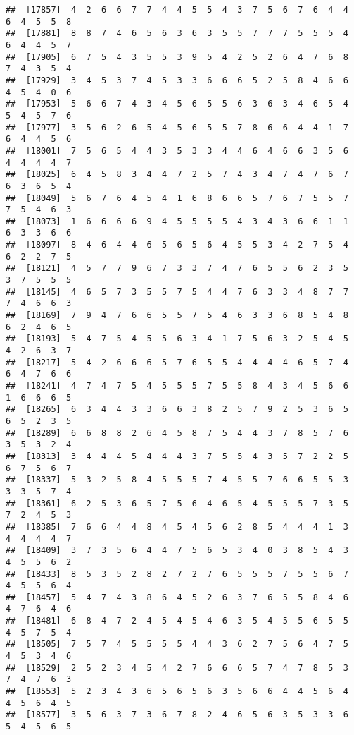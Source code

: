 \documentclass[
]{book}
\begin{document}
\begin{verbatim}
##  [17857]  4  2  6  6  7  7  4  4  5  5  4  3  7  5  6  7  6  4  4  6  4  5  5  8
##  [17881]  8  8  7  4  6  5  6  3  6  3  5  5  7  7  7  5  5  5  4  6  4  4  5  7
##  [17905]  6  7  5  4  3  5  5  3  9  5  4  2  5  2  6  4  7  6  8  7  4  3  5  4
##  [17929]  3  4  5  3  7  4  5  3  3  6  6  6  5  2  5  8  4  6  6  4  5  4  0  6
##  [17953]  5  6  6  7  4  3  4  5  6  5  5  6  3  6  3  4  6  5  4  5  4  5  7  6
##  [17977]  3  5  6  2  6  5  4  5  6  5  5  7  8  6  6  4  4  1  7  6  4  4  5  6
##  [18001]  7  5  6  5  4  4  3  5  3  3  4  4  6  4  6  6  3  5  6  4  4  4  4  7
##  [18025]  6  4  5  8  3  4  4  7  2  5  7  4  3  4  7  4  7  6  7  6  3  6  5  4
##  [18049]  5  6  7  6  4  5  4  1  6  8  6  6  5  7  6  7  5  5  7  7  5  4  6  3
##  [18073]  1  6  6  6  6  9  4  5  5  5  5  4  3  4  3  6  6  1  1  6  3  3  6  6
##  [18097]  8  4  6  4  4  6  5  6  5  6  4  5  5  3  4  2  7  5  4  6  2  2  7  5
##  [18121]  4  5  7  7  9  6  7  3  3  7  4  7  6  5  5  6  2  3  5  3  7  5  5  5
##  [18145]  4  6  5  7  3  5  5  7  5  4  4  7  6  3  3  4  8  7  7  7  4  6  6  3
##  [18169]  7  9  4  7  6  6  5  5  7  5  4  6  3  3  6  8  5  4  8  6  2  4  6  5
##  [18193]  5  4  7  5  4  5  5  6  3  4  1  7  5  6  3  2  5  4  5  4  2  6  3  7
##  [18217]  5  4  2  6  6  6  5  7  6  5  5  4  4  4  4  6  5  7  4  6  4  7  6  6
##  [18241]  4  7  4  7  5  4  5  5  5  7  5  5  8  4  3  4  5  6  6  1  6  6  6  5
##  [18265]  6  3  4  4  3  3  6  6  3  8  2  5  7  9  2  5  3  6  5  6  5  2  3  5
##  [18289]  6  6  8  8  2  6  4  5  8  7  5  4  4  3  7  8  5  7  6  3  5  3  2  4
##  [18313]  3  4  4  4  5  4  4  4  3  7  5  5  4  3  5  7  2  2  5  6  7  5  6  7
##  [18337]  5  3  2  5  8  4  5  5  5  7  4  5  5  7  6  6  5  5  3  3  3  5  7  4
##  [18361]  6  2  5  3  6  5  7  5  6  4  6  5  4  5  5  5  7  3  5  7  2  4  5  3
##  [18385]  7  6  6  4  4  8  4  5  4  5  6  2  8  5  4  4  4  1  3  4  4  4  4  7
##  [18409]  3  7  3  5  6  4  4  7  5  6  5  3  4  0  3  8  5  4  3  4  5  5  6  2
##  [18433]  8  5  3  5  2  8  2  7  2  7  6  5  5  5  7  5  5  6  7  4  5  5  6  4
##  [18457]  5  4  7  4  3  8  6  4  5  2  6  3  7  6  5  5  8  4  6  4  7  6  4  6
##  [18481]  6  8  4  7  2  4  5  4  5  4  6  3  5  4  5  5  6  5  5  4  5  7  5  4
##  [18505]  7  5  7  4  5  5  5  5  4  4  3  6  2  7  5  6  4  7  5  4  5  3  4  6
##  [18529]  2  5  2  3  4  5  4  2  7  6  6  6  5  7  4  7  8  5  3  7  4  7  6  3
##  [18553]  5  2  3  4  3  6  5  6  5  6  3  5  6  6  4  4  5  6  4  4  5  6  4  5
##  [18577]  3  5  6  3  7  3  6  7  8  2  4  6  5  6  3  5  3  3  6  5  4  5  6  5

\end{verbatim}
\end{document}
